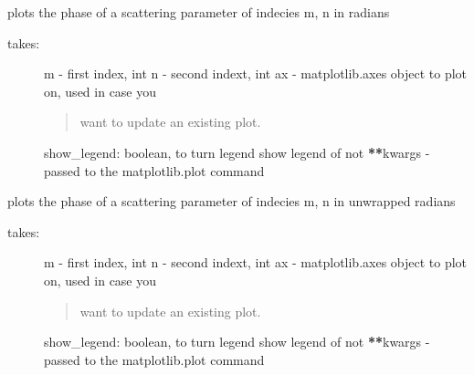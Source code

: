 \documentclass[letterpaper,10pt,english]{sphinxmanual}
\begin{document}
\begin{fulllineitems}
\begin{fulllineitems}
\begin{description}
\end{description}

\end{fulllineitems}


\begin{fulllineitems}
\label{auto_network:mwavepy.Network.plot_s_rad}
plots the phase of a scattering parameter of indecies m, n in
radians
\begin{description}
\item[{takes:}] \leavevmode
m - first index, int
n - second indext, int
ax - matplotlib.axes object to plot on, used in case you
\begin{quote}

want to update an existing plot.
\end{quote}

show\_legend: boolean, to turn legend show legend of not
{\color{red}\bfseries{}**}kwargs - passed to the matplotlib.plot command

\end{description}

\end{fulllineitems}


\begin{fulllineitems}
\label{auto_network:mwavepy.Network.plot_s_rad_unwrapped}
plots the phase of a scattering parameter of indecies m, n in
unwrapped radians
\begin{description}
\item[{takes:}] \leavevmode
m - first index, int
n - second indext, int
ax - matplotlib.axes object to plot on, used in case you
\begin{quote}

want to update an existing plot.
\end{quote}

show\_legend: boolean, to turn legend show legend of not
{\color{red}\bfseries{}**}kwargs - passed to the matplotlib.plot command

\end{description}


\end{fulllineitems}
\end{fulllineitems}
\end{document}

